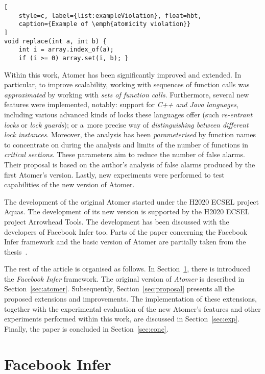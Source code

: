 \documentclass{ExcelAtFIT}
\theoremstyle{definition}
\begin{document}
\begin{lstlisting}[
    style=c, label={list:exampleViolation}, float=hbt,
    caption={Example of \emph{atomicity violation}}
]
void replace(int a, int b) {
    int i = array.index_of(a);
    if (i >= 0) array.set(i, b); }
\end{lstlisting}

Within this work, Atomer has been significantly improved and extended. In particular, to improve scalability, working with sequences of function calls was \emph{approximated} by working with \emph{sets of function calls}. Furthermore, several new features were implemented, notably: support for \emph{C++ and Java languages}, including various advanced kinds of locks these languages offer (such \emph{re-entrant locks} or \emph{lock guards}); or a~more precise way of \emph{distinguishing between different lock instances}. Moreover, the analysis has been \emph{parameterised} by function names to concentrate on during the analysis and limits of the number of functions in \emph{critical sections}. These parameters aim to reduce the number of false alarms. Their proposal is based on the author's analysis of false alarms produced by the first Atomer's version. Lastly, new experiments were performed to test capabilities of the new version of Atomer.

The development of the original Atomer started under the H2020 ECSEL project Aquas. The development of its new version is supported by the H2020 ECSEL project Arrowhead Tools. The development has been discussed with the developers of Facebook Infer too. Parts of the paper concerning the Facebook Infer framework and the basic version of Atomer are partially taken from the thesis~\cite{harmimBP}.

The rest of the article is organised as follows. In Section~\ref{sec:infer}, there is introduced the \emph{Facebook Infer} framework. The original version of \emph{Atomer} is described in Section~\ref{sec:atomer}. Subsequently, Section~\ref{sec:proposal} presents all the proposed extensions and improvements. The implementation of these extensions, together with the experimental evaluation of the new Atomer's features and other experiments performed within this work, are discussed in Section~\ref{sec:exp}. Finally, the paper is concluded in Section~\ref{sec:conc}.


\section{Facebook Infer}
\label{sec:infer}
\end{document}
